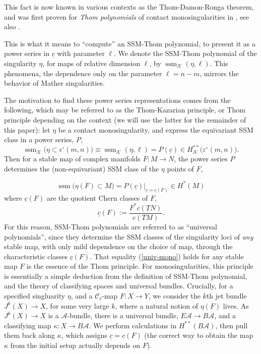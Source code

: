 \documentclass[11pt]{article}
\theoremstyle{plain}
\theoremstyle{definition}
\theoremstyle{definition}
\newcounter{equation}
\DeclareMathOperator{\ssm}{ssm}
\begin{document}
This fact is now known in various contexts as the Thom-Damon-Ronga theorem, and was first proven for \textit{Thom polynomials} of contact monosingularities in \cite{damon, ronga72}, see also \cite{thom}. 



This is what it means to ``compute'' an SSM-Thom polynomial, to present it as a power series in $\underline{c}$ with parameter $\ell$. We denote the SSM-Thom polynomial of the singularity $\eta$, for maps of relative dimension $\ell$, by $
\ssm_{\mathcal K}(\eta,\ell)$. This phenomena, the dependence only on the parameter $\ell=n-m$, mirrors the behavior of Mather singularities. 

The motivation to find these power series representations comes from the following, which may be referred to as the Thom-Kazarian principle, or Thom principle depending on the context (we will use the latter for the remainder of this paper): let $\eta$ be a contact monosingularity, and express the equivariant SSM class in a power series, $P$,
\[
\ssm_\mathcal K\big(\eta\subset \epsilon^{\circ}(m,n)\big) \equiv \ssm_{\mathcal K}(\eta,\ell) = P(\underline{c}) \in H^{**}_{\mathcal K}\big(\varepsilon^\circ(m,n)\big).
\]
Then for a stable map of complex manifolds $F: M \to N$, the power series $P$ determines the (non-equivariant) SSM class of the $\eta$ points of $F$,

\begin{equation}\label{univ-mono}
 \ssm\big(\eta(F)\subset M\big) = P(\underline{c})\Big|_{\underline{c}=\underline{c}(F)} \in H^{*}(M)
\end{equation}
where $\underline{c}(F)$ are the quotient Chern classes of $F$,
\[
\underline{c}(F):=\frac{F^*c(TN)}{c(TM)}.
\]
For this reason, SSM-Thom polynomials are referred to as ``universal polynomials'', since they determine the SSM classes of the singularity loci of \textit{any} stable map, with only mild dependence on the choice of map, through the characteristic classes $\underline{c}(F)$. That equality
(\ref{univ-mono}) holds for any stable map $F$ is the essence of the Thom principle. For monosingularities, this principle is essentially a simple deduction from the definition of SSM-Thom polynomial, and the theory of classifying spaces and universal bundles. Crucially, for a specified singluarity $\eta$, and a $\mathcal C_\ell$-map $F: X \to Y$, we consider the $k$th jet bundle $J^k(X)\to X$, for some very large $k$, where a natural notion of $\eta(F)$ lives. As $J^k(X)\to X$ is a $\mathcal A$-bundle, there is a universal bundle, $E\mathcal A \to B\mathcal A$, and a classifying map $\kappa: X\to B\mathcal A$. We perform calculations in $H^{**}(B\mathcal A)$, then pull them back along $\kappa$, which assigns $\underline{c}=c(F)$ (the correct way to obtain the map $\kappa$ from the initial setup actually depends on $F$). 
\end{document}
